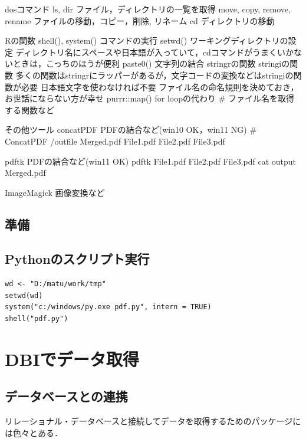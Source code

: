 \documentclass[
]{article}
\begin{document}
dosコマンド
ls, dir
ファイル，ディレクトリの一覧を取得
move, copy, remove, rename
ファイルの移動，コピー，削除, リネーム
cd
ディレクトリの移動

Rの関数
shell(), system()
コマンドの実行
setwd()
ワーキングディレクトリの設定
ディレクトリ名にスペースや日本語が入っていて，cdコマンドがうまくいかないときは，こっちのほうが便利
paste0()
文字列の結合
stringrの関数
stringiの関数
多くの関数はstringrにラッパーがあるが，文字コードの変換などはstringiの関数が必要
日本語文字を使わなければ不要
ファイル名の命名規則を決めておき，お世話にならない方が幸せ
purrr::map()
for loopの代わり
\# ファイル名を取得する関数など

その他ツール
concatPDF
PDFの結合など(win10 OK，win11 NG)
\# ConcatPDF /outfile Merged.pdf File1.pdf File2.pdf File3.pdf

pdftk
PDFの結合など(win11 OK)
pdftk File1.pdf File2.pdf File3.pdf cat output Merged.pdf

ImageMagick
画像変換など

\hypertarget{ux6e96ux5099-4}{%
\subsection{準備}\label{ux6e96ux5099-4}}

\hypertarget{pythonux306eux30b9ux30afux30eaux30d7ux30c8ux5b9fux884c}{%
\subsection{Pythonのスクリプト実行}\label{pythonux306eux30b9ux30afux30eaux30d7ux30c8ux5b9fux884c}}

\begin{verbatim}
wd <- "D:/matu/work/tmp"
setwd(wd)
system("c:/windows/py.exe pdf.py", intern = TRUE)
shell("pdf.py")
\end{verbatim}

\hypertarget{dbi}{%
\section{DBIでデータ取得}\label{dbi}}

\hypertarget{ux30c7ux30fcux30bfux30d9ux30fcux30b9ux3068ux306eux9023ux643a}{%
\subsection{データベースとの連携}\label{ux30c7ux30fcux30bfux30d9ux30fcux30b9ux3068ux306eux9023ux643a}}

リレーショナル・データベースと接続してデータを取得するためのパッケージには色々とある．
\end{document}
